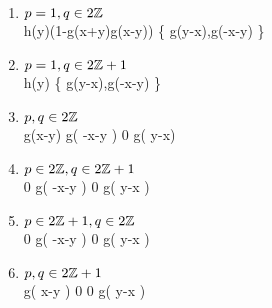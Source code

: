 \begin{enumerate}[(1)]
	\item $p=1,q\in2\mathbb{Z}$\\
\hspace*{0cm}\commonShift\mytableThreeTwo	%
{}		{\yimyStack}
{\yipx}			{h(y)(1-g(x+y)g(x-y))}
{\yimx}			{\max\left\{ g(y-x),g(-x-y) \right\}}
	\item $p=1,q\in2\mathbb{Z}+1$\\
\hspace*{0cm}\commonShift\mytableThreeTwo	%
{}		{\yimyStack}
{\yipx}			{h(y)}
{\yimx}			{\max\left\{ g(y-x),g(-x-y) \right\}}
	\item $p,q\in2\mathbb{Z}$\\
\hspace*{-0cm}\commonShift\mytable	%
{}	{\yipy}					{\yimy}
{\yipx}	{g\kern-0.05cm\left({x-y}\right)} 	{g\kern-0.05cm\left( {-x-y} \right)}
{\yipx}	{0} 					{g\kern-0.05cm\left( {y-x}\right)}
\item $p\in2\mathbb{Z},q\in2\mathbb{Z}+1$\\
\commonShift\mytable	%
{}	{\yipy}	{\yimy}
{\yipx} {0}	{g\kern-0.05cm\left( {-x-y} \right)}
{\yimx} {0} 	{g\kern-0.05cm\left( {y-x} \right)}
\item $p\in2\mathbb{Z}+1,q\in2\mathbb{Z}$\\
\commonShift\mytable	%
{}		{\yipy}		{\yimy}
{\yipx}		{0} 		{g\kern-0.05cm\left( {-x-y} \right)}	
{\yimx} 	{0} 		{g\kern-0.05cm\left( {y-x} \right)}
\item $p,q\in2\mathbb{Z}+1$\\
\commonShift\mytable	%
{}		{\yipy}							{\yimy}
{{\yipx}}	{g\kern-0.05cm\left( {x-y} \right)}			{0}
{{\yimx}}	{0}							{g\kern-0.05cm\left( {y-x} \right)}	
\end{enumerate}
